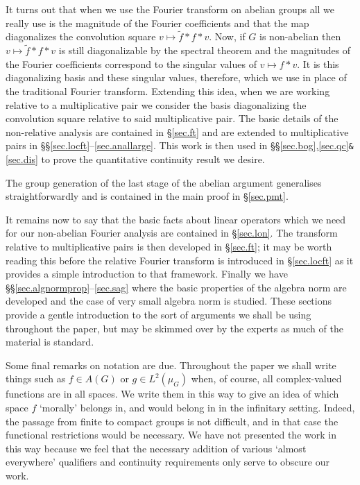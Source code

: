 \documentclass[12pt]{amsart}
\numberwithin{equation}{section}
\theoremstyle{plain}
\theoremstyle{definition}
\begin{document}
It turns out that when we use the Fourier transform on abelian groups all we really use is the magnitude of the Fourier coefficients and that the map diagonalizes the convolution square $v \mapsto\tilde{f} \ast f\ast v$. Now, if $G$ is non-abelian then $v \mapsto \tilde{f} \ast f \ast v$ is still diagonalizable by the spectral theorem and the magnitudes of the Fourier coefficients correspond to the singular values of $v \mapsto f \ast v$.  It is this diagonalizing basis and these singular values, therefore, which we use in place of the traditional Fourier transform.  Extending this idea, when we are working relative to a multiplicative pair we consider the basis diagonalizing the convolution square relative to said multiplicative pair.  The basic details of the non-relative analysis are contained in \S\ref{sec.ft} and are extended to multiplicative pairs in \S\S\ref{sec.locft}--\ref{sec.anallarge}.  This work is then used in \S\S\ref{sec.bog},\ref{sec.qc}\verb!&!\ref{sec.dis} to prove the quantitative continuity result we desire.

The group generation of the last stage of the abelian argument generalises straightforwardly and is contained in the main proof in \S\ref{sec.pmt}.

It remains now to say that the basic facts about linear operators which we need for our non-abelian Fourier analysis are contained in \S\ref{sec.lon}.  The transform relative to multiplicative pairs is then developed in \S\ref{sec.ft}; it may be worth reading this before the relative Fourier transform is introduced in \S\ref{sec.locft} as it provides a simple introduction to that framework.  Finally we have \S\S\ref{sec.algnormprop}--\ref{sec.sag} where the basic properties of the algebra norm are developed and the case of very small algebra norm is studied.  These sections provide a gentle introduction to the sort of arguments we shall be using throughout the paper, but may be skimmed over by the experts as much of the material is standard.

Some final remarks on notation are due.  Throughout the paper we shall write things such as $f \in A(G)$ or $g \in L^2(\mu_G)$ when, of course, all complex-valued functions are in all spaces.  We write them in this way to give an idea of which space $f$ `morally' belongs in, and would belong in in the infinitary setting.  Indeed, the passage from finite to compact groups is not difficult, and in that case the functional restrictions would be necessary.  We have not presented the work in this way because we feel that the necessary addition of various `almost everywhere' qualifiers and continuity requirements only serve to obscure our work.
\end{document}
